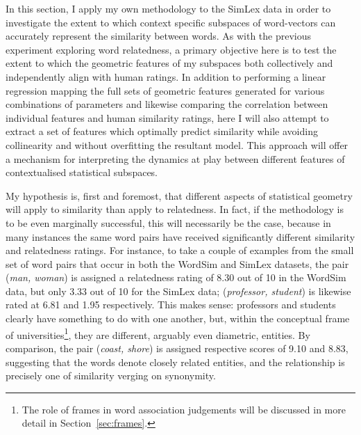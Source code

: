 In this section, I apply my own methodology to the SimLex data in order to investigate the extent to which context specific subspaces of word-vectors can accurately represent the similarity between words.  As with the previous experiment exploring word relatedness, a primary objective here is to test the extent to which the geometric features of my subspaces both collectively and independently align with human ratings.  In addition to performing a linear regression mapping the full sets of geometric features generated for various combinations of parameters and likewise comparing the correlation between individual features and human similarity ratings, here I will also attempt to extract a set of features which optimally predict similarity while avoiding collinearity and without overfitting the resultant model.  This approach will offer a mechanism for interpreting the dynamics at play between different features of contextualised statistical subspaces.

My hypothesis is, first and foremost, that different aspects of statistical geometry will apply to similarity than apply to relatedness.  In fact, if the methodology is to be even marginally successful, this will necessarily be the case, because in many instances the same word pairs have received significantly different similarity and relatedness ratings.  For instance, to take a couple of examples from the small set of word pairs that occur in both the WordSim and SimLex datasets, the pair (\emph{man, woman}) is assigned a relatedness rating of 8.30 out of 10 in the WordSim data, but only 3.33 out of 10 for the SimLex data; (\emph{professor, student}) is likewise rated at 6.81 and 1.95 respectively.  This makes sense: professors and students clearly have something to do with one another, but, within the conceptual frame of universities\footnote{The role of frames in word association judgements will be discussed in more detail in Section~\ref{sec:frames}.}, they are different, arguably even diametric, entities.  By comparison, the pair (\emph{coast, shore}) is assigned respective scores of 9.10 and 8.83, suggesting that the words denote closely related entities, and the relationship is precisely one of similarity verging on synonymity.

